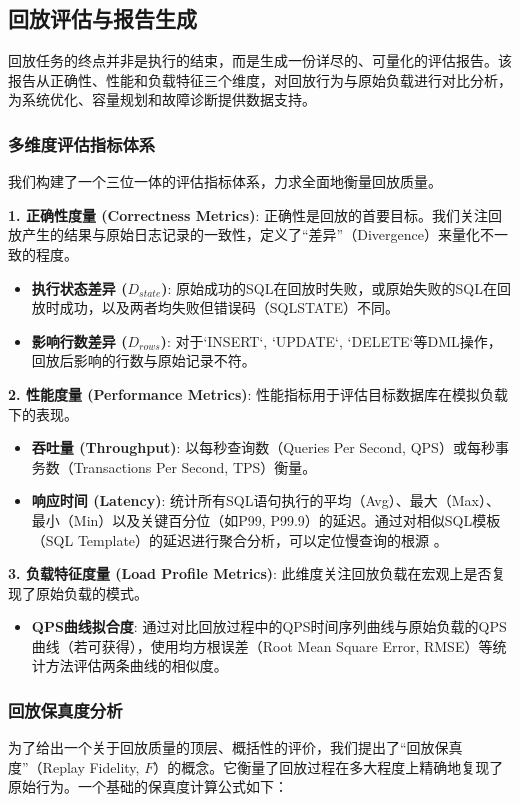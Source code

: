 \subsection{回放评估与报告生成}
\label{sec:evaluation}
回放任务的终点并非是执行的结束，而是生成一份详尽的、可量化的评估报告。该报告从正确性、性能和负载特征三个维度，对回放行为与原始负载进行对比分析，为系统优化、容量规划和故障诊断提供数据支持。

\subsubsection{多维度评估指标体系}
我们构建了一个三位一体的评估指标体系，力求全面地衡量回放质量。

\textbf{1. 正确性度量 (Correctness Metrics)}:
正确性是回放的首要目标。我们关注回放产生的结果与原始日志记录的一致性，定义了“差异”（Divergence）来量化不一致的程度。
\begin{itemize}
    \item \textbf{执行状态差异 ($D_{state}$)}: 原始成功的SQL在回放时失败，或原始失败的SQL在回放时成功，以及两者均失败但错误码（SQLSTATE）不同。
    \item \textbf{影响行数差异 ($D_{rows}$)}: 对于`INSERT`, `UPDATE`, `DELETE`等DML操作，回放后影响的行数与原始记录不符。
\end{itemize}

\textbf{2. 性能度量 (Performance Metrics)}:
性能指标用于评估目标数据库在模拟负载下的表现。
\begin{itemize}
    \item \textbf{吞吐量 (Throughput)}: 以每秒查询数（Queries Per Second, QPS）或每秒事务数（Transactions Per Second, TPS）衡量。
    \item \textbf{响应时间 (Latency)}: 统计所有SQL语句执行的平均（Avg）、最大（Max）、最小（Min）以及关键百分位（如P99, P99.9）的延迟。通过对相似SQL模板（SQL Template）的延迟进行聚合分析，可以定位慢查询的根源 \cite{SQLFingerprinting}。
\end{itemize}

\textbf{3. 负载特征度量 (Load Profile Metrics)}:
此维度关注回放负载在宏观上是否复现了原始负载的模式。
\begin{itemize}
    \item \textbf{QPS曲线拟合度}: 通过对比回放过程中的QPS时间序列曲线与原始负载的QPS曲线（若可获得），使用均方根误差（Root Mean Square Error, RMSE）等统计方法评估两条曲线的相似度。
\end{itemize}

\subsubsection{回放保真度分析}
为了给出一个关于回放质量的顶层、概括性的评价，我们提出了“回放保真度”（Replay Fidelity, $F$）的概念。它衡量了回放过程在多大程度上精确地复现了原始行为。一个基础的保真度计算公式如下：

